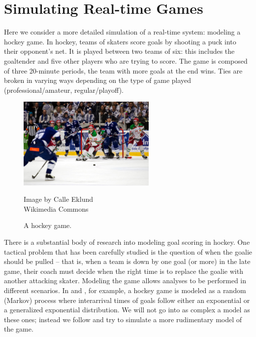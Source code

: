 \newpage

\section{Simulating Real-time Games}

Here we consider a more detailed simulation of a real-time system: modeling a hockey game.
In hockey, teams of skaters score goals by shooting a puck into their opponent's net.
It is played between two teams of six: this includes the goaltender and five other players who are trying to score.
The game is composed of three 20-minute periods, the team with more goals at the end wins. 
Ties are broken in varying ways depending on the type of game played (professional/amateur, regular/playoff).

\begin{figure}[htbp]
	\centering
	\includegraphics[width=0.6\textwidth]{fig/2012-12-29_skott_01.jpg}
        \begin{imcredit}{90mm}{85mm}
           Image by Calle Eklund \\ Wikimedia Commons
        \end{imcredit}
	\caption{A hockey game. \label{fig:4_hockey}}
\end{figure}

There is a substantial body of research into modeling goal scoring in hockey.
One tactical problem that has been carefully studied is the question of when the goalie should be pulled -- that is, when a team is down by one goal (or more) in the late game, their coach must decide when the right time is to replace the goalie with another attacking skater.
Modeling the game allows analyses to be performed in different scenarios.
In \cite{t07} and \cite{bs10}, for example, a hockey game is modeled as a random (Markov) process where interarrival times of goals follow either an exponential or a generalized exponential distribution.
We will not go into as complex a model as these ones; instead we follow \cite{mw86} and try to simulate a more rudimentary model of the game.

